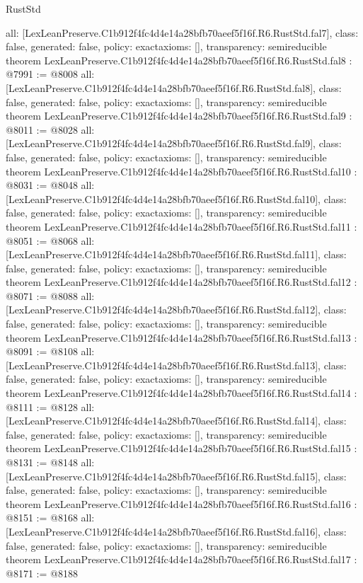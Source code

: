 \begin{lexlean}{RustStd}
\begin{coremodule}
{  all: [LexLeanPreserve.C1b912f4fc4d4e14a28bfb70aeef5f16f.R6.RustStd.fal7],
  class: false,
  generated: false,
  policy: exact{axioms: []},
  transparency: semireducible
}
theorem LexLeanPreserve.C1b912f4fc4d4e14a28bfb70aeef5f16f.R6.RustStd.fal8 : @7991 := @8008 {
  all: [LexLeanPreserve.C1b912f4fc4d4e14a28bfb70aeef5f16f.R6.RustStd.fal8],
  class: false,
  generated: false,
  policy: exact{axioms: []},
  transparency: semireducible
}
theorem LexLeanPreserve.C1b912f4fc4d4e14a28bfb70aeef5f16f.R6.RustStd.fal9 : @8011 := @8028 {
  all: [LexLeanPreserve.C1b912f4fc4d4e14a28bfb70aeef5f16f.R6.RustStd.fal9],
  class: false,
  generated: false,
  policy: exact{axioms: []},
  transparency: semireducible
}
theorem LexLeanPreserve.C1b912f4fc4d4e14a28bfb70aeef5f16f.R6.RustStd.fal10 : @8031 := @8048 {
  all: [LexLeanPreserve.C1b912f4fc4d4e14a28bfb70aeef5f16f.R6.RustStd.fal10],
  class: false,
  generated: false,
  policy: exact{axioms: []},
  transparency: semireducible
}
theorem LexLeanPreserve.C1b912f4fc4d4e14a28bfb70aeef5f16f.R6.RustStd.fal11 : @8051 := @8068 {
  all: [LexLeanPreserve.C1b912f4fc4d4e14a28bfb70aeef5f16f.R6.RustStd.fal11],
  class: false,
  generated: false,
  policy: exact{axioms: []},
  transparency: semireducible
}
theorem LexLeanPreserve.C1b912f4fc4d4e14a28bfb70aeef5f16f.R6.RustStd.fal12 : @8071 := @8088 {
  all: [LexLeanPreserve.C1b912f4fc4d4e14a28bfb70aeef5f16f.R6.RustStd.fal12],
  class: false,
  generated: false,
  policy: exact{axioms: []},
  transparency: semireducible
}
theorem LexLeanPreserve.C1b912f4fc4d4e14a28bfb70aeef5f16f.R6.RustStd.fal13 : @8091 := @8108 {
  all: [LexLeanPreserve.C1b912f4fc4d4e14a28bfb70aeef5f16f.R6.RustStd.fal13],
  class: false,
  generated: false,
  policy: exact{axioms: []},
  transparency: semireducible
}
theorem LexLeanPreserve.C1b912f4fc4d4e14a28bfb70aeef5f16f.R6.RustStd.fal14 : @8111 := @8128 {
  all: [LexLeanPreserve.C1b912f4fc4d4e14a28bfb70aeef5f16f.R6.RustStd.fal14],
  class: false,
  generated: false,
  policy: exact{axioms: []},
  transparency: semireducible
}
theorem LexLeanPreserve.C1b912f4fc4d4e14a28bfb70aeef5f16f.R6.RustStd.fal15 : @8131 := @8148 {
  all: [LexLeanPreserve.C1b912f4fc4d4e14a28bfb70aeef5f16f.R6.RustStd.fal15],
  class: false,
  generated: false,
  policy: exact{axioms: []},
  transparency: semireducible
}
theorem LexLeanPreserve.C1b912f4fc4d4e14a28bfb70aeef5f16f.R6.RustStd.fal16 : @8151 := @8168 {
  all: [LexLeanPreserve.C1b912f4fc4d4e14a28bfb70aeef5f16f.R6.RustStd.fal16],
  class: false,
  generated: false,
  policy: exact{axioms: []},
  transparency: semireducible
}
theorem LexLeanPreserve.C1b912f4fc4d4e14a28bfb70aeef5f16f.R6.RustStd.fal17 : @8171 := @8188 {
}
\end{coremodule}
\end{lexlean}
